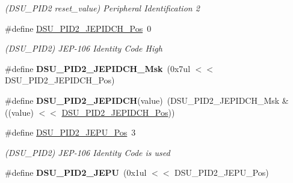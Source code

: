 \begin{DoxyCompactItemize}
\begin{DoxyCompactList}\small\item\em (D\+S\+U\+\_\+\+P\+I\+D2 reset\+\_\+value) Peripheral Identification 2 \end{DoxyCompactList}\item 
\hypertarget{group___s_a_m_l21___d_s_u_ga4b2aa922b81ecb07b672d813558306fc}{}\#define \hyperlink{group___s_a_m_l21___d_s_u_ga4b2aa922b81ecb07b672d813558306fc}{D\+S\+U\+\_\+\+P\+I\+D2\+\_\+\+J\+E\+P\+I\+D\+C\+H\+\_\+\+Pos}~0\label{group___s_a_m_l21___d_s_u_ga4b2aa922b81ecb07b672d813558306fc}

\begin{DoxyCompactList}\small\item\em (D\+S\+U\+\_\+\+P\+I\+D2) J\+E\+P-\/106 Identity Code High \end{DoxyCompactList}\item 
\hypertarget{group___s_a_m_l21___d_s_u_ga9aa269300c59a1466dd1e04f8bfbd7a1}{}\#define {\bfseries D\+S\+U\+\_\+\+P\+I\+D2\+\_\+\+J\+E\+P\+I\+D\+C\+H\+\_\+\+Msk}~(0x7ul $<$$<$ D\+S\+U\+\_\+\+P\+I\+D2\+\_\+\+J\+E\+P\+I\+D\+C\+H\+\_\+\+Pos)\label{group___s_a_m_l21___d_s_u_ga9aa269300c59a1466dd1e04f8bfbd7a1}

\item 
\hypertarget{group___s_a_m_l21___d_s_u_ga37fa971dc278d5f39db2207b421c5dc3}{}\#define {\bfseries D\+S\+U\+\_\+\+P\+I\+D2\+\_\+\+J\+E\+P\+I\+D\+C\+H}(value)~(D\+S\+U\+\_\+\+P\+I\+D2\+\_\+\+J\+E\+P\+I\+D\+C\+H\+\_\+\+Msk \& ((value) $<$$<$ \hyperlink{group___s_a_m_l21___d_s_u_ga4b2aa922b81ecb07b672d813558306fc}{D\+S\+U\+\_\+\+P\+I\+D2\+\_\+\+J\+E\+P\+I\+D\+C\+H\+\_\+\+Pos}))\label{group___s_a_m_l21___d_s_u_ga37fa971dc278d5f39db2207b421c5dc3}

\item 
\hypertarget{group___s_a_m_l21___d_s_u_ga88346fef117d36aa2dba1ffabc5e908a}{}\#define \hyperlink{group___s_a_m_l21___d_s_u_ga88346fef117d36aa2dba1ffabc5e908a}{D\+S\+U\+\_\+\+P\+I\+D2\+\_\+\+J\+E\+P\+U\+\_\+\+Pos}~3\label{group___s_a_m_l21___d_s_u_ga88346fef117d36aa2dba1ffabc5e908a}

\begin{DoxyCompactList}\small\item\em (D\+S\+U\+\_\+\+P\+I\+D2) J\+E\+P-\/106 Identity Code is used \end{DoxyCompactList}\item 
\hypertarget{group___s_a_m_l21___d_s_u_ga967771691bc8307f873ebe12770a9b46}{}\#define {\bfseries D\+S\+U\+\_\+\+P\+I\+D2\+\_\+\+J\+E\+P\+U}~(0x1ul $<$$<$ D\+S\+U\+\_\+\+P\+I\+D2\+\_\+\+J\+E\+P\+U\+\_\+\+Pos)\label{group___s_a_m_l21___d_s_u_ga967771691bc8307f873ebe12770a9b46}


\end{DoxyCompactItemize}
